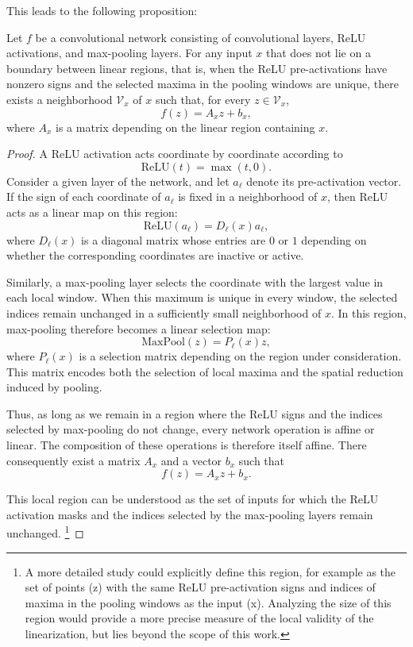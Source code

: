 This leads to the following proposition:

\begin{proposition}
Let $f$ be a convolutional network consisting of convolutional layers, ReLU activations, and
max-pooling layers. For any input $x$ that does not lie
on a boundary between linear regions, that is, when the ReLU
pre-activations have nonzero signs and the selected maxima in the pooling windows
are unique, there exists a neighborhood $\mathcal{V}_x$ of $x$ such that, for every
$z \in \mathcal{V}_x$,
\[
    f(z) = A_x z + b_x,
\]
where $A_x$ is a matrix depending on the linear region containing $x$.
\end{proposition}

\begin{proof}
A ReLU activation acts coordinate by coordinate according to
\[
    \mathrm{ReLU}(t)=\max(t,0).
\]
Consider a given layer of the network, and let $a_\ell$ denote its pre-activation vector.
If the sign of each coordinate of $a_\ell$ is fixed in a neighborhood of $x$, then ReLU
acts as a linear map on this region:
\[
    \mathrm{ReLU}(a_\ell)=D_\ell(x)a_\ell,
\]
where $D_\ell(x)$ is a diagonal matrix whose entries are $0$ or $1$ depending on whether the
corresponding coordinates are inactive or active.

Similarly, a max-pooling layer selects the coordinate with the largest value
in each local window. When this maximum is unique in every window, the selected indices
remain unchanged in a sufficiently small neighborhood of $x$. In this region, max-pooling
therefore becomes a linear selection map:
\[
    \mathrm{MaxPool}(z)=P_\ell(x)z,
\]
where $P_\ell(x)$ is a selection matrix depending on the region under consideration. This matrix
encodes both the selection of local maxima and the spatial reduction induced by pooling.

Thus, as long as we remain in a region where the ReLU signs and the indices selected
by max-pooling do not change, every network operation is affine or linear. The
composition of these operations is therefore itself affine. There consequently exist a matrix $A_x$ and a
vector $b_x$ such that
\[
    f(z)=A_xz+b_x.
\]

This local region can be understood as the set of inputs for which the ReLU activation
masks and the indices selected by the max-pooling layers remain unchanged.
\footnote{A more detailed study could explicitly define this region,
for example as the set of points (z) with the same ReLU pre-activation
signs and indices of maxima in the pooling windows as the input (x).
Analyzing the size of this region would provide a more precise measure of the local
validity of the linearization, but lies beyond the scope of this work.}

\end{proof}

